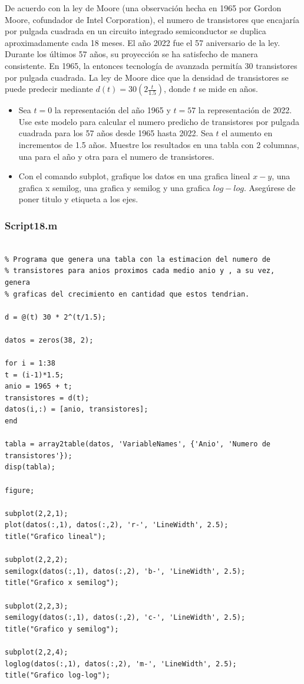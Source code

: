 \documentclass{article}
\begin{document}
	De acuerdo con la ley de Moore (una observación hecha en 1965 por Gordon Moore, cofundador de Intel Corporation), el numero de transistores que encajaría por pulgada cuadrada en un circuito integrado semiconductor se duplica aproximadamente cada 18 meses. El año 2022 fue el 57 aniversario de la ley. Durante los últimos 57 años, su proyección se ha satisfecho de manera consistente. En 1965, la entonces tecnología de avanzada permitía 30 transistores por pulgada cuadrada. La ley de Moore dice que la densidad de transistores se puede predecir mediante $d(t) = 30(2\frac{t}{1.5})$, donde $t$ se mide en años.
	
	\begin{itemize}
		\item Sea $t = 0$ la representación del año 1965 y $t = 57$ la representación de 2022. Use este modelo para calcular el numero predicho de transistores por pulgada cuadrada para los 57 años desde 1965 hasta 2022. Sea $t$ el aumento en incrementos de 1.5 años. Muestre los resultados en una tabla con 2 columnas, una para el año y otra para el numero de transistores.
		\item Con el comando subplot, grafique los datos en una grafica lineal $x - y$, una grafica x semilog, una grafica y semilog y una grafica $log-log$. Asegúrese de poner titulo y etiqueta a los ejes.
	\end{itemize}
	
	\subsubsection{Script18.m}
	
	\begin{lstlisting}

% Programa que genera una tabla con la estimacion del numero de
% transistores para anios proximos cada medio anio y , a su vez, genera
% graficas del crecimiento en cantidad que estos tendrian.

d = @(t) 30 * 2^(t/1.5);

datos = zeros(38, 2);

for i = 1:38
t = (i-1)*1.5; 
anio = 1965 + t;
transistores = d(t);
datos(i,:) = [anio, transistores];
end

tabla = array2table(datos, 'VariableNames', {'Anio', 'Numero de transistores'});
disp(tabla);

figure;

subplot(2,2,1);
plot(datos(:,1), datos(:,2), 'r-', 'LineWidth', 2.5);
title("Grafico lineal");

subplot(2,2,2);
semilogx(datos(:,1), datos(:,2), 'b-', 'LineWidth', 2.5);
title("Grafico x semilog");

subplot(2,2,3);
semilogy(datos(:,1), datos(:,2), 'c-', 'LineWidth', 2.5);
title("Grafico y semilog");

subplot(2,2,4);
loglog(datos(:,1), datos(:,2), 'm-', 'LineWidth', 2.5);
title("Grafico log-log");


	\end{lstlisting}
	
\end{document}
